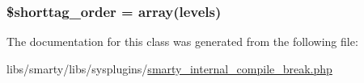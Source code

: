 \subsubsection[{\$shorttag\+\_\+order}]{\setlength{\rightskip}{0pt plus 5cm}\$shorttag\+\_\+order = array(\textquotesingle{}levels\textquotesingle{})}\label{class_smarty___internal___compile___break_a2ccb25269c3a92e8c4796c7ef23725e6}


The documentation for this class was generated from the following file\+:\begin{DoxyCompactItemize}
\item 
libs/smarty/libs/sysplugins/\hyperlink{smarty__internal__compile__break_8php}{smarty\+\_\+internal\+\_\+compile\+\_\+break.\+php}\end{DoxyCompactItemize}
